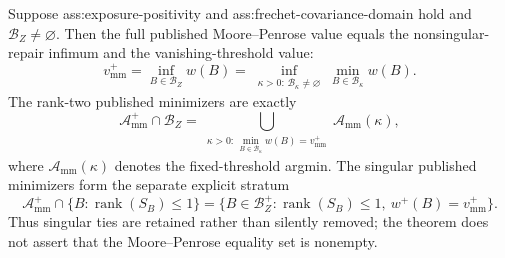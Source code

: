 Suppose ass:exposure-positivity and ass:frechet-covariance-domain hold and \(\mathcal B_Z\ne\varnothing\).  Then the full published Moore--Penrose value equals the nonsingular-repair infimum and the vanishing-threshold value:
\[
 v_{\mathrm{mm}}^+
 =\inf_{B\in\mathcal B_Z}w(B)
 =\inf_{\substack{\kappa>0:\,\mathcal B_\kappa\ne\varnothing}}
   \min_{B\in\mathcal B_\kappa}w(B).
\]
The rank-two published minimizers are exactly
\[
 \mathcal A_{\mathrm{mm}}^+\cap\mathcal B_Z
 =\bigcup_{\substack{\kappa>0:\,
 \min_{B\in\mathcal B_\kappa}w(B)=v_{\mathrm{mm}}^+}}
 \mathcal A_{\mathrm{mm}}(\kappa),
\]
where \(\mathcal A_{\mathrm{mm}}(\kappa)\) denotes the fixed-threshold argmin.  The singular published minimizers form the separate explicit stratum
\[
 \mathcal A_{\mathrm{mm}}^+\cap\{B:\operatorname{rank}(S_B)\le1\}
 =\{B\in\mathcal B_Z^+:\operatorname{rank}(S_B)\le1,\ w^+(B)=v_{\mathrm{mm}}^+\}.
\]
Thus singular ties are retained rather than silently removed; the theorem does not assert that the Moore--Penrose equality set is nonempty.